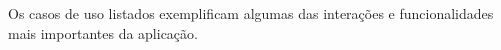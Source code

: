 Os casos de uso listados exemplificam algumas das interações e funcionalidades mais importantes da aplicação.

